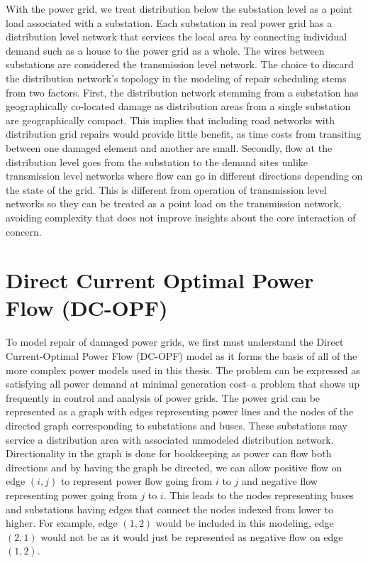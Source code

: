 With the power grid, we treat distribution below the substation level as a point load associated with a substation. Each substation in real power grid has a distribution level network that services the local area by connecting individual demand such as a house to the power grid as a whole. The wires between substations are considered the transmission level network. The choice to discard the distribution network's topology in the modeling of repair scheduling stems from two factors. First, the distribution network stemming from a substation has geographically co-located damage as distribution areas from a single substation are geographically compact. This implies that including road networks with distribution grid repairs would provide little benefit, as time costs from transiting between one damaged element and another are small. Secondly, flow at the distribution level goes from the substation to the demand sites unlike transmission level networks where flow can go in different directions depending on the state of the grid. This is different from operation of transmission level networks so they can be treated as a point load on the transmission network, avoiding complexity that does not improve insights about the core interaction of concern.

\section{Direct Current Optimal Power Flow (DC-OPF)}
To model repair of damaged power grids, we first must understand the Direct Current-Optimal Power Flow (DC-OPF) model as it forms the basis of all of the more complex power models used in this thesis. The problem can be expressed as satisfying all power demand at minimal generation cost--a problem that shows up frequently in control and analysis of power grids. The power grid can be represented as a graph with edges representing power lines and the nodes of the directed graph corresponding to substations and buses. These substations may service a distribution area with associated unmodeled distribution network. Directionality in the graph is done for bookkeeping as power can flow both directions and by having the graph be directed, we can allow positive flow on edge $(i,j)$ to represent power flow going from $i$ to $j$ and negative flow representing power going from $j$ to $i$. This leads to the nodes representing buses and substations having edges that connect the nodes indexed from lower to higher. For example, edge $(1,2)$ would be included in this modeling, edge $(2,1)$ would not be as it would just be represented as negative flow on edge $(1,2)$.


